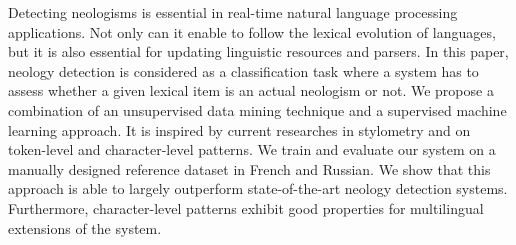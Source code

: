 Detecting neologisms is essential in real-time natural language processing applications. Not only can it enable to follow the lexical evolution of languages, but it is also essential for updating  linguistic resources and parsers. In this paper, neology detection is considered as a classification task where a system has to assess whether a given lexical item is an actual neologism or not. We propose a combination of an unsupervised data mining technique and a supervised machine learning approach. It is inspired by current researches in stylometry and on token-level and character-level patterns. We train and evaluate our system on a manually designed reference dataset in French and Russian. We show that this approach is able to largely outperform state-of-the-art neology detection systems. Furthermore, character-level patterns exhibit good properties for multilingual extensions of the system.
